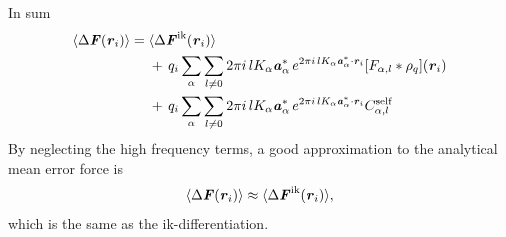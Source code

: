 \documentclass[aps,pre,preprint]{revtex4}
\renewcommand{\v}[1]{\textbf{\textit{#1}}}
\begin{document}
In sum
\begin{align} \nonumber
  \langle \Delta\v F(\v r_i)\rangle
  =\;&
  \langle \Delta\v F^{\textrm{ik}}(\v r_i)\rangle\\\nonumber
  &+\,
  q_i\sum_{\alpha}\sum_{l\neq 0}
  2\pi i\,l K_\alpha\v a_\alpha^\ast\,e^{2\pi i\,l K_\alpha\v a^\ast_\alpha\cdot \v r_i}
  [F_{\alpha,l}\ast\rho_q](\v r_i) \\\label{eqn:tmp41}
  &+\,
  q_i\sum_{\alpha}\sum_{l\neq 0}
  2\pi i\,l K_\alpha\v a_\alpha^\ast\,e^{2\pi i\,l K_\alpha\v a^\ast_\alpha\cdot \v r_i}
  C_{\alpha,l}^{\textrm{self}}
\end{align}
By neglecting the high frequency terms, a good approximation to the analytical
mean error force is 
\begin{align}\label{eqn:tmp42}
  \langle \Delta\v F(\v r_i)\rangle
  \approx
  \langle \Delta\v F^{\textrm{ik}}(\v r_i)\rangle,
\end{align}
which is the same as the ik-differentiation.
\end{document}
